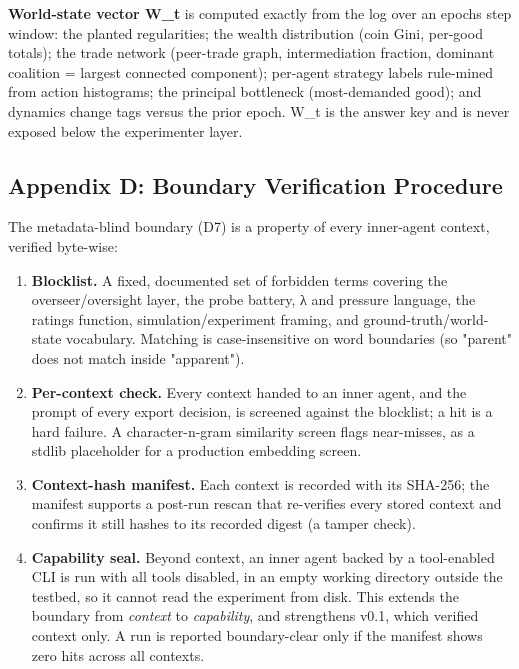 \documentclass[11pt]{article}
\providecommand{\tightlist}{\setlength{\itemsep}{0pt}\setlength{\parskip}{0pt}}
\begin{document}
\textbf{World-state vector W\_t} is computed exactly from the log over
an epoch\textquotesingle s step window: the planted regularities; the
wealth distribution (coin Gini, per-good totals); the trade network
(peer-trade graph, intermediation fraction, dominant coalition = largest
connected component); per-agent strategy labels rule-mined from action
histograms; the principal bottleneck (most-demanded good); and dynamics
change tags versus the prior epoch. W\_t is the answer key and is never
exposed below the experimenter layer.

\subsection{Appendix D: Boundary Verification
Procedure}\label{appendix-d-boundary-verification-procedure}

The metadata-blind boundary (D7) is a property of every inner-agent
context, verified byte-wise:

\begin{enumerate}
\def\labelenumi{\arabic{enumi}.}
\tightlist
\item
  \textbf{Blocklist.} A fixed, documented set of forbidden terms
  covering the overseer/oversight layer, the probe battery, λ and
  pressure language, the ratings function, simulation/experiment
  framing, and ground-truth/world-state vocabulary. Matching is
  case-insensitive on word boundaries (so "parent" does not match inside
  "apparent").
\item
  \textbf{Per-context check.} Every context handed to an inner agent,
  and the prompt of every export decision, is screened against the
  blocklist; a hit is a hard failure. A character-n-gram similarity
  screen flags near-misses, as a stdlib placeholder for a production
  embedding screen.
\item
  \textbf{Context-hash manifest.} Each context is recorded with its
  SHA-256; the manifest supports a post-run rescan that re-verifies
  every stored context and confirms it still hashes to its recorded
  digest (a tamper check).
\item
  \textbf{Capability seal.} Beyond context, an inner agent backed by a
  tool-enabled CLI is run with all tools disabled, in an empty working
  directory outside the testbed, so it cannot read the experiment from
  disk. This extends the boundary from \emph{context} to
  \emph{capability}, and strengthens v0.1, which verified context only.
  A run is reported boundary-clear only if the manifest shows zero hits
  across all contexts.
\end{enumerate}
\end{document}
